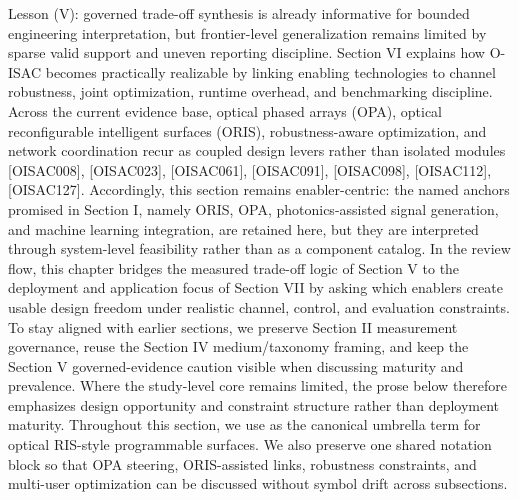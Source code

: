 {}Lesson (V): governed trade-off synthesis is already informative for bounded engineering interpretation, but frontier-level generalization remains limited by sparse valid support and uneven reporting discipline.\markdownRendererInterblockSeparator
{}
\markdownRendererSectionEnd 
\markdownRendererSectionEnd \markdownRendererSectionBegin
{}\markdownRendererInterblockSeparator
{}Section VI explains how O-ISAC becomes practically realizable by linking enabling technologies to channel robustness, joint optimization, runtime overhead, and benchmarking discipline. Across the current evidence base, optical phased arrays (OPA), optical reconfigurable intelligent surfaces (ORIS), robustness-aware optimization, and network coordination recur as coupled design levers rather than isolated modules [O\markdownRendererUnderscore{}ISAC\markdownRendererUnderscore{}008], [O\markdownRendererUnderscore{}ISAC\markdownRendererUnderscore{}023], [O\markdownRendererUnderscore{}ISAC\markdownRendererUnderscore{}061], [O\markdownRendererUnderscore{}ISAC\markdownRendererUnderscore{}091], [O\markdownRendererUnderscore{}ISAC\markdownRendererUnderscore{}098], [O\markdownRendererUnderscore{}ISAC\markdownRendererUnderscore{}112], [O\markdownRendererUnderscore{}ISAC\markdownRendererUnderscore{}127]. Accordingly, this section remains enabler-centric: the named anchors promised in Section I, namely ORIS, OPA, photonics-assisted signal generation, and machine learning integration, are retained here, but they are interpreted through system-level feasibility rather than as a component catalog. In the review flow, this chapter bridges the measured trade-off logic of Section V to the deployment and application focus of Section VII by asking which enablers create usable design freedom under realistic channel, control, and evaluation constraints. To stay aligned with earlier sections, we preserve Section II measurement governance, reuse the Section IV medium/taxonomy framing, and keep the Section V governed-evidence caution visible when discussing maturity and prevalence. Where the study-level core remains limited, the prose below therefore emphasizes design opportunity and constraint structure rather than deployment maturity.\markdownRendererParagraphSeparator
{}Throughout this section, we use  as the canonical umbrella term for optical RIS-style programmable surfaces. We also preserve one shared notation block so that OPA steering, ORIS-assisted links, robustness constraints, and multi-user optimization can be discussed without symbol drift across subsections.\markdownRendererParagraphSeparator

